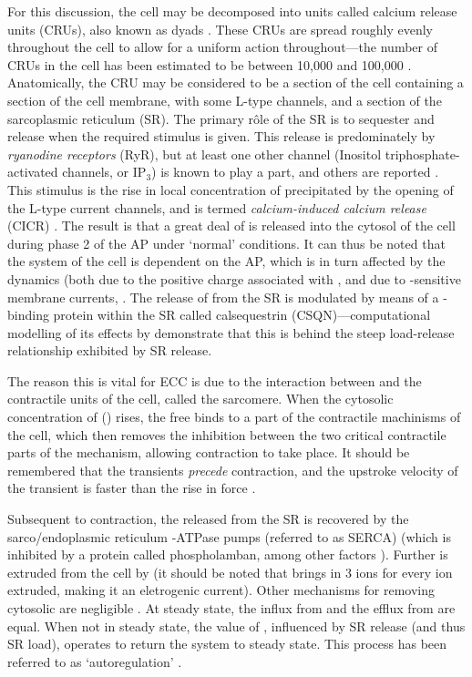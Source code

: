 \documentclass[../thesis-main.tex]{subfiles}
\begin{document}
 For this discussion, the cell may be decomposed into units called calcium release units (CRUs), also known as dyads \citep{Cleemann1998}. These CRUs are spread roughly evenly throughout the cell to allow for a uniform action throughout---the number of CRUs in the cell has been estimated to be between 10,000 and 100,000 \citep{Cleemann1998,Greenstein2002}. Anatomically, the CRU may be considered to be a section of the cell containing a section of the cell membrane, with some L-type \ca{} channels, and a section of the sarcoplasmic reticulum (SR). The primary r\^ole of the SR is to sequester and release \ca{} when the required stimulus is given. This release is predominately by \emph{ryanodine receptors} (RyR), but at least one other channel (Inositol triphosphate-activated channels, or IP$_3$) is known to play a part, and others are reported \citep{Pozzan1994}. This stimulus is the rise in local concentration of \ca{} precipitated by the opening of the L-type \ca{} current channels, and is termed \emph{calcium-induced calcium release} (CICR) \citep{Fabiato1992}. The result is that a great deal of \ca{} is released into the cytosol of the cell during phase 2 of the AP under `normal' conditions. It can thus be noted that the \ca{} system of the cell is dependent on the AP, which is in turn affected by the \ca{} dynamics (both due to the positive charge associated with \ca{}, and due to \ca{}-sensitive membrane currents, \eg{} \ica{} \citep{Weiss2006}. The release of \ca{} from the SR is modulated by means of a \ca{}-binding protein within the SR called calsequestrin (CSQN)---computational modelling of its effects by \citet{Restrepo2008} demonstrate that this is behind the steep load-release relationship exhibited by SR release.
 
 The reason this is vital for ECC is due to the interaction between \ca{} and the contractile units of the cell, called the sarcomere. When the cytosolic concentration of \ca{} (\cai{}) rises, the free \ca{} binds to a part of the contractile machinisms of the cell, which then removes the inhibition between the two critical contractile parts of the mechanism, allowing contraction to take place. It should be remembered that the \ca{} transients \emph{precede} contraction, and the upstroke velocity of the transient is faster than the rise in force \citep{Lee1988}.
 
 Subsequent to contraction, the \ca{} released from the SR is recovered by the sarco/endoplasmic reticulum \ca{}-ATPase pumps (referred to as SERCA) \citep{Franzini-Armstrong2005} (which is inhibited by a protein called phospholamban, among other factors \citep{Talukder2009, Xu1993, Eisner2000}). Further \ca{} is extruded from the cell by \inaca{} \citep{Laurita2008} (it should be noted that \inaca{} brings in 3 \na{} ions for every \ca{} ion extruded, making it an eletrogenic current). Other mechanisms for removing cytosolic \ca{} are negligible \citep{Bassani1994}. At steady state, the influx from \ica{} and the efflux from \inaca{} are equal. When not in steady state, the value of \cai{}, influenced by SR \ca{} release (and thus SR \ca{} load), operates to return the system to steady state. This process has been referred to as `autoregulation' \citep{Eisner2000}.
 
\end{document}
